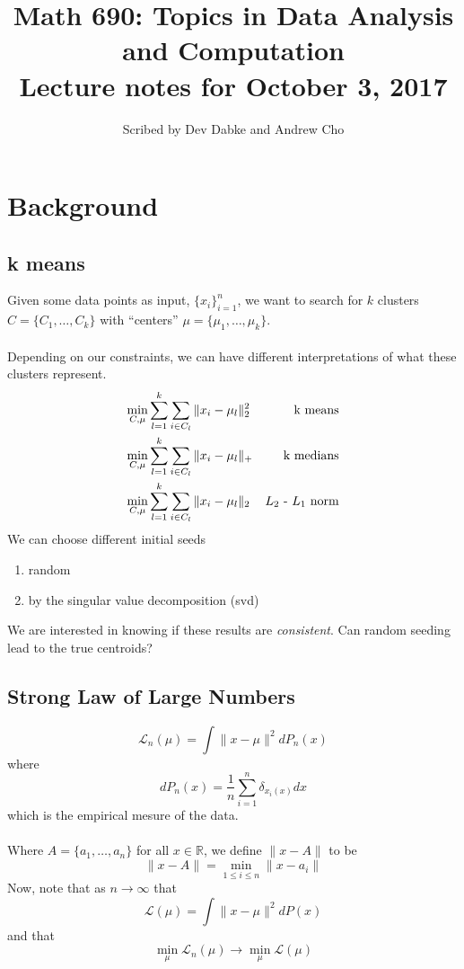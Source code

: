 \documentclass[12pt]{article}
\title{Math 690: Topics in Data Analysis and Computation \\
Lecture notes for October 3, 2017}
\date{}
\author{Scribed by Dev Dabke and Andrew Cho}
\theoremstyle{plain}
\begin{document}
\maketitle

\section{Background}
\label{sec:background}

\subsection{k means}
\label{subsec:kmeans}

Given some data points as input, $ \{ x_i \}^n_{i = 1} $, we want to search for $ k $ clusters $ C = \{ C_1, \ldots, C_k \} $ with ``centers'' $ \mu = \{ \mu_1, \ldots, \mu_k \} $.
\\ \\
Depending on our constraints, we can have different interpretations of what these clusters represent.
\begin{align*}
  \min_{C, \mu} & \sum_{l = 1}^k \sum_{i \in C_{l}} \| x_i - \mu_{l} \|_2^2 & \text{k means} \\
  \min_{C, \mu} & \sum_{l = 1}^k \sum_{i \in C_{l}} \| x_i - \mu_{l} \|_{+} & \text{k medians} \\
  \min_{C, \mu} & \sum_{l = 1}^k \sum_{i \in C_{l}} \| x_i - \mu_{l} \|_2 & \text{$ L_2 $ - $ L_1 $ norm}
\end{align*}
We can choose different initial seeds
\begin{enumerate}
  \item random
  \item by the singular value decomposition (svd)
\end{enumerate}
We are interested in knowing if these results are \textit{consistent}.
Can random seeding lead to the true centroids?

\subsection{Strong Law of Large Numbers}
\label{subsec:slln}

\[
\mathcal{L}_n (\mu) = \int \| x - \mu \|^2 d P_n(x)
\]
where
\[
d P_n (x) = \frac{1}{n} \sum_{i = 1}^n \delta_{x_{i} (x)} dx
\]
which is the empirical mesure of the data.
\\ \\
Where $ A = \{ a_1, \ldots, a_n \} $ for all $ x \in \mathbb{R} $, we define $ \| x - A \| $ to be
\[
\| x - A \| = \min_{1 \leq i \leq n} \| x - a_i \|
\]
Now, note that as $ n \to \infty $ that
\[
\mathcal{L} (\mu) = \int \| x - \mu \|^2 dP(x)
\]
and that
\[
\min_{\mu} \mathcal{L}_n (\mu) \to \min_{\mu} \mathcal{L} (\mu)
\]
\end{document}

